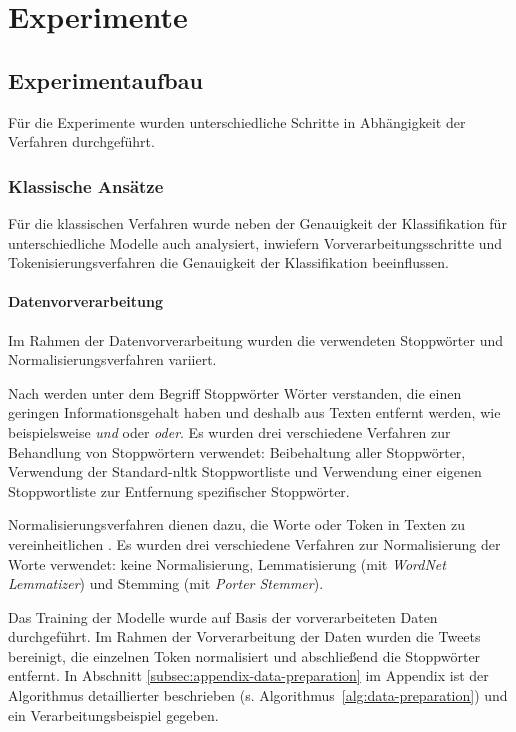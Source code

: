 \section{Experimente}

\subsection{Experimentaufbau}

Für die Experimente wurden unterschiedliche Schritte in Abhängigkeit der Verfahren durchgeführt.

\subsubsection{Klassische Ansätze}\label{subsubsec:experimente-klassische-ansaetze}

Für die klassischen Verfahren wurde neben der Genauigkeit der Klassifikation für unterschiedliche Modelle auch analysiert, inwiefern Vorverarbeitungsschritte und Tokeni\-sie\-rungs\-verfahren die Genauigkeit der Klassifikation beeinflussen.

\paragraph{Datenvorverarbeitung}
Im Rahmen der Datenvorverarbeitung wurden die verwendeten Stoppwörter und Normalisierungsverfahren variiert.

Nach \cite[S.27]{manning2009introduction} werden unter dem Begriff Stoppwörter Wörter verstanden, die einen geringen Informationsgehalt haben und deshalb aus Texten entfernt werden, wie beispielsweise \textit{und} oder \textit{oder}.
Es wurden drei verschiedene Verfahren zur Behandlung von Stoppwörtern verwendet: Beibehaltung aller Stoppwörter, Verwendung der Standard-\gls{nltk} Stoppwortliste und Verwendung einer eigenen Stoppwortliste zur Entfernung spezifischer Stoppwörter.

Normalisierungsverfahren dienen dazu, die Worte oder Token in Texten zu vereinheitlichen \cite[S.28]{manning2009introduction}.
Es wurden drei verschiedene Verfahren zur Normalisierung der Worte verwendet: keine Normalisierung, Lemmatisierung (mit \textit{WordNet Lemmatizer}) und Stemming (mit \textit{Porter Stemmer}).

Das Training der Modelle wurde auf Basis der vorverarbeiteten Daten durchgeführt.
Im Rahmen der Vorverarbeitung der Daten wurden die Tweets bereinigt, die einzelnen Token normalisiert und abschließend die Stoppwörter entfernt.
In Abschnitt \ref{subsec:appendix-data-preparation} im Appendix ist der Algorithmus detaillierter beschrieben (s. Algorithmus~\ref{alg:data-preparation}) und ein Verarbeitungsbeispiel gegeben.

